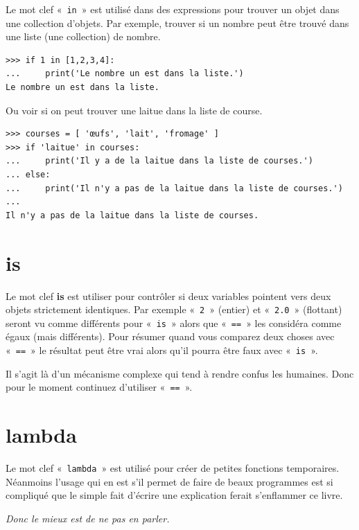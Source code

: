 Le mot clef «~\texttt{in}~» est utilisé dans des expressions pour trouver un objet dans une collection d'objets. Par exemple, trouver si un nombre peut être trouvé dans une liste (une collection) de nombre.

\begin{Verbatim}[frame=single,rulecolor=\color{gray}]
>>> if 1 in [1,2,3,4]:
...     print('Le nombre un est dans la liste.')
Le nombre un est dans la liste.
\end{Verbatim}

Ou voir si on peut trouver une laitue dans la liste de course.

\begin{Verbatim}[frame=single,rulecolor=\color{gray}]
>>> courses = [ 'œufs', 'lait', 'fromage' ]
>>> if 'laitue' in courses:
...     print('Il y a de la laitue dans la liste de courses.')
... else:
...     print('Il n'y a pas de la laitue dans la liste de courses.')
...
Il n'y a pas de la laitue dans la liste de courses.
\end{Verbatim}

\section*{is}

Le mot clef \textbf{is} est utiliser pour contrôler si deux variables pointent vers deux objets strictement identiques. Par exemple «~\texttt{2}~» (entier) et «~\texttt{2.0}~» (flottant) seront vu comme différents pour «~\texttt{is}~» alors que «~\texttt{==}~» les considéra comme égaux (mais différents). Pour résumer quand vous comparez deux choses avec «~\texttt{==}~» le résultat peut être vrai alors qu'il pourra être faux avec  «~\texttt{is}~».

Il s'agit là d'un mécanisme complexe qui tend à rendre confus les humaines. Donc pour le moment continuez d'utiliser «~\texttt{==}~».

\section*{lambda}

Le mot clef «~\texttt{lambda}~» est utilisé pour créer de petites fonctions temporaires. Néanmoins l'usage qui en est s'il permet de faire de beaux programmes est si compliqué que le simple fait d'écrire une explication ferait s'enflammer ce livre.

\emph{Donc le mieux est de ne pas en parler.}


